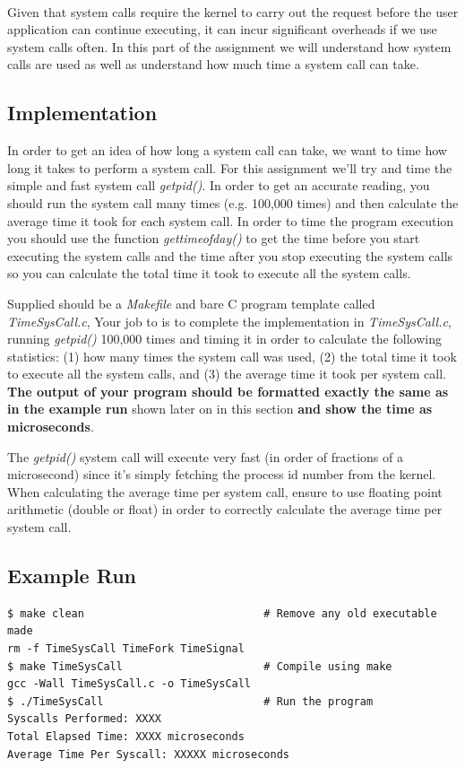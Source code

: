 \documentclass{article}
\begin{document}
\-\ \\ Given that system calls require the kernel to carry out the request before the user application can continue executing, it can incur significant overheads if we use system calls often. In this part of the assignment we will understand how system calls are used as well as understand how much time a system call can take.
 
\subsection*{Implementation}
In order to get an idea of how long a system call can take, we want to time how long it takes to perform a system call. For this assignment we'll try and time the simple and fast system call \textit{getpid()}. In order to get an accurate reading, you should run the system call many times (e.g. 100,000 times) and then calculate the average time it took for each system call. In order to time the program execution you should use the function \textit{gettimeofday()} to get the time before you start executing the system calls and the time after you stop executing the system calls so you can calculate the total time it took to execute all the system calls. 

Supplied should be a \textit{Makefile} and bare C program template called \textit{TimeSysCall.c}, Your job to is to complete the implementation in \textit{TimeSysCall.c}, running \textit{getpid()} 100,000 times and timing it in order to calculate the following statistics: (1) how many times the system call was used, (2) the total time it took to execute all the system calls, and (3) the average time it took per system call. \textbf{The output of your program should be formatted exactly the same as in the example run} shown later on in this section \textbf{and show the time as microseconds}.

\begin{info}
The \textit{getpid()} system call will execute very fast (in order of fractions of a microsecond) since it's simply fetching the process id number from the kernel. When calculating the average time per system call, ensure to use floating point arithmetic (double or float) in order to correctly calculate the average time per system call.
\end{info}

\subsection*{Example Run}
\begin{commandline}
	\begin{verbatim}
$ make clean                            # Remove any old executable made
rm -f TimeSysCall TimeFork TimeSignal 
$ make TimeSysCall                      # Compile using make
gcc -Wall TimeSysCall.c -o TimeSysCall
$ ./TimeSysCall                         # Run the program
Syscalls Performed: XXXX
Total Elapsed Time: XXXX microseconds
Average Time Per Syscall: XXXXX microseconds
	\end{verbatim}
\end{commandline}
\end{document}
